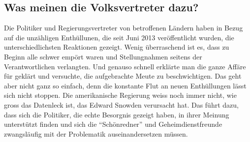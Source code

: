 \subsection{Was meinen die Volksvertreter dazu?}
Die Politiker und Regierungsvertreter von betroffenen Ländern haben in Bezug auf die unzähligen Enthüllunen, die seit Juni 2013 veröffentlicht wurden, die unterschiedlichsten Reaktionen gezeigt.
Wenig überraschend ist es, dass zu Beginn alle schwer empört waren und Stellungnahmen seitens der Verantwortlichen verlangten.
Und genauso schnell erklärte man die ganze Affäre für geklärt und versuchte, die aufgebrachte Meute zu beschwichtigen. Das geht aber nicht ganz so einfach, denn die konstante Flut an neuen Enthüllungen lässt sich nicht stoppen.
Die amerikanische Regierung weiss noch immer nicht, wie gross das Datenleck ist, das Edward Snowden verursacht hat.
Das führt dazu, dass sich die Politiker, die echte Besorgnis gezeigt haben, in ihrer Meinung unterstützt finden und sich die ``Schönredner'' und Geheimdienstfreunde zwangsläufig mit der Problematik auseinandersetzen müssen.
\\
\\


